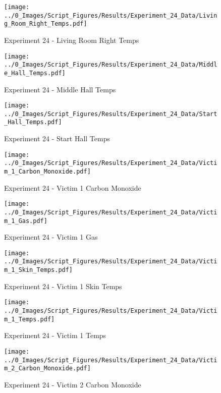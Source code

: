 	\clearpage

	\begin{figure}[H]
		\centering
		\texttt{[image: ../0\_Images/Script\_Figures/Results/Experiment\_24\_Data/Living\_Room\_Right\_Temps.pdf]}
		\caption[]{Experiment 24 - Living Room Right Temps}
	\end{figure}
 

	\begin{figure}[H]
		\centering
		\texttt{[image: ../0\_Images/Script\_Figures/Results/Experiment\_24\_Data/Middle\_Hall\_Temps.pdf]}
		\caption[]{Experiment 24 - Middle Hall Temps}
	\end{figure}
 
	\clearpage

	\begin{figure}[H]
		\centering
		\texttt{[image: ../0\_Images/Script\_Figures/Results/Experiment\_24\_Data/Start\_Hall\_Temps.pdf]}
		\caption[]{Experiment 24 - Start Hall Temps}
	\end{figure}
 

	\begin{figure}[H]
		\centering
		\texttt{[image: ../0\_Images/Script\_Figures/Results/Experiment\_24\_Data/Victim\_1\_Carbon\_Monoxide.pdf]}
		\caption[]{Experiment 24 - Victim 1 Carbon Monoxide}
	\end{figure}
 
	\clearpage

	\begin{figure}[H]
		\centering
		\texttt{[image: ../0\_Images/Script\_Figures/Results/Experiment\_24\_Data/Victim\_1\_Gas.pdf]}
		\caption[]{Experiment 24 - Victim 1 Gas}
	\end{figure}
 

	\begin{figure}[H]
		\centering
		\texttt{[image: ../0\_Images/Script\_Figures/Results/Experiment\_24\_Data/Victim\_1\_Skin\_Temps.pdf]}
		\caption[]{Experiment 24 - Victim 1 Skin Temps}
	\end{figure}
 
	\clearpage

	\begin{figure}[H]
		\centering
		\texttt{[image: ../0\_Images/Script\_Figures/Results/Experiment\_24\_Data/Victim\_1\_Temps.pdf]}
		\caption[]{Experiment 24 - Victim 1 Temps}
	\end{figure}
 

	\begin{figure}[H]
		\centering
		\texttt{[image: ../0\_Images/Script\_Figures/Results/Experiment\_24\_Data/Victim\_2\_Carbon\_Monoxide.pdf]}
		\caption[]{Experiment 24 - Victim 2 Carbon Monoxide}
	\end{figure}
 
